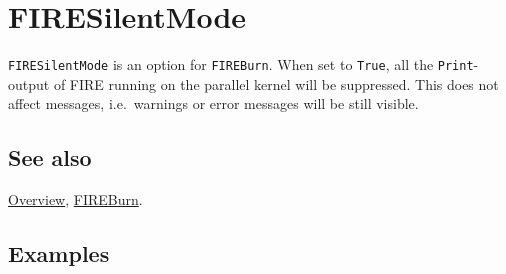 \documentclass[../FeynHelpersManual.tex]{subfiles}
\begin{document}
\hypertarget{firesilentmode}{
\section{FIRESilentMode}\label{firesilentmode}}

\texttt{FIRESilentMode} is an option for \texttt{FIREBurn}. When set to
\texttt{True}, all the \texttt{Print}-output of FIRE running on the
parallel kernel will be suppressed. This does not affect messages,
i.e.~warnings or error messages will be still visible.

\subsection{See also}

\hyperlink{toc}{Overview}, \hyperlink{fireburn}{FIREBurn}.

\subsection{Examples}
\end{document}
